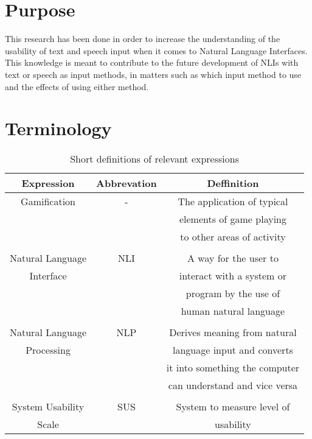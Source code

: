 \section{Purpose}
This research has been done in order to increase the understanding of the usability of text and speech input when it comes to Natural Language Interfaces. This knowledge is meant to contribute to the future development of NLIs with text or speech as input methods, in matters such as which input method to use and the effects of using either method.


\section{Terminology}

\begin{table}[ht]
  \centering
  \begin{tabular}{ccc}
    \toprule
    Expression & Abbrevation & Deffinition\\
    \midrule
    Gamification & - & The application of typical\\
    & & elements of game playing\\
    & & to other areas of activity \\
    \\
    Natural Language & NLI & A way for the user to\\
    Interface & & interact with a system or\\ 
    & & program by the use of\\
    & & human natural language\\
    \\
    Natural Language & NLP & Derives meaning from natural\\
    Processing & & language input and converts\\
    & & it into something the computer\\
    & & can understand and vice versa\\
    \\
    System Usability & SUS & System to measure level of\\
    Scale & &  usability\\
    \bottomrule
  \end{tabular}
  \caption{Short definitions of relevant expressions}\label{termin}
\end{table}